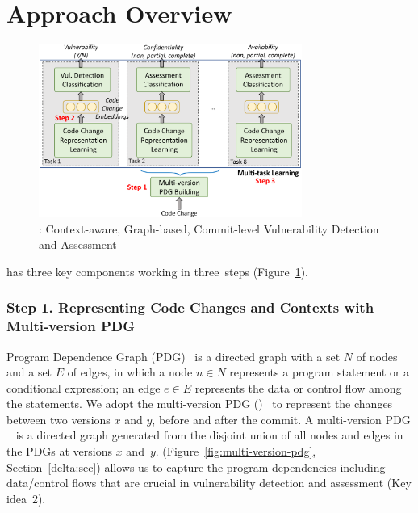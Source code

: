 \section{Approach Overview}
\label{overview:sec}

\begin{figure}[t]
	\centering
	\includegraphics[width=3.4in]{graphs/overview-4.png}
	\vspace{-16pt}
	\caption{{\tool}: Context-aware, Graph-based, Commit-level
Vulnerability Detection and Assessment}
	\label{fig:overview}
\end{figure}


\noindent {\tool} has three key components working in three~steps
(Figure~\ref{fig:overview}).



\subsubsection*{{\bf Step 1. Representing Code Changes and Contexts with Multi-version PDG}}
Program Dependence Graph (PDG)~\cite{pdg} is a directed graph with a
set $N$ of nodes and a set $E$ of edges, in which a node $n \in N$
represents a program statement or a conditional expression; an edge $e
\in E$ represents the data or control flow among the statements.
We adopt the multi-version PDG ({\mvpdgxy})~\cite{flexeme-fse20} to
represent the changes between two versions $x$ and $y$, before and
after the commit.  A multi-version PDG {\mvpdgxy}~\cite{flexeme-fse20}
is a directed graph generated from the disjoint union of all nodes and
edges in the PDGs at versions $x$ and~$y$. {\mvpdgxy}
(Figure~\ref{fig:multi-version-pdg}, Section~\ref{delta:sec}) allows
us to capture the program dependencies including data/control flows
that are crucial in vulnerability detection and assessment (Key
idea~2).

